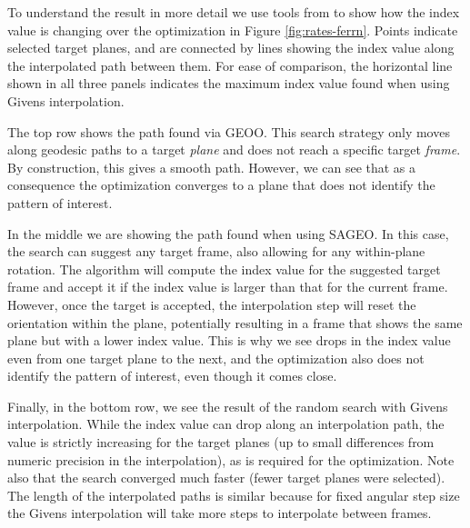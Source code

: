 To understand the result in more detail we use tools from  \citep{ferrn} to show how the index value is changing over the optimization in Figure \ref{fig:rates-ferrn}. Points indicate selected target planes, and are connected by lines showing the index value along the interpolated path between them. For ease of comparison, the horizontal line shown in all three panels indicates the maximum index value found when using Givens interpolation.

The top row shows the path found via GEOO. This search strategy only moves along geodesic paths to a target \emph{plane} and does not reach a specific target \emph{frame}. By construction, this gives a smooth path. However, we can see that as a consequence the optimization converges to a plane that does not identify the pattern of interest.

In the middle we are showing the path found when using SAGEO. In this case, the search can suggest any target frame, also allowing for any within-plane rotation. The algorithm will compute the index value for the suggested target frame and accept it if the index value is larger than that for the current frame. However, once the target is accepted, the interpolation step will reset the orientation within the plane, potentially resulting in a frame that shows the same plane but with a lower index value. This is why we see drops in the index value even from one target plane to the next, and the optimization also does not identify the pattern of interest, even though it comes close.

Finally, in the bottom row, we see the result of the random search with Givens interpolation. While the index value can drop along an interpolation path, the value is strictly increasing for the target planes (up to small differences from numeric precision in the interpolation), as is required for the optimization. Note also that the search converged much faster (fewer target planes were selected). The length of the interpolated paths is similar because for fixed angular step size the Givens interpolation will take more steps to interpolate between frames.

